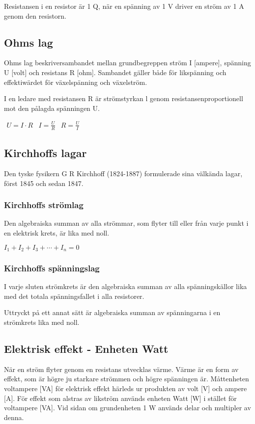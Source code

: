 \documentclass[a4paper,twoside,twocolumn,openright]{book}
\begin{document}
Resistansen i en resistor är 1 Q, när en
spänning av 1 V driver en ström av 1 A
genom den resistorn.

\subsection{Ohms lag}
Ohms lag beskriversambandet mellan grundbegreppen ström I [ampere], spänning U
[volt] och resistans R [ohm].
Sambandet gäller både för likspänning och effektiwärdet för växelspänning och
växelström.

I en ledare med resistansen R är strömstyrkan l genom resistansenproportionell
mot den pålagda spänningen U.

$\begin{array}{ccc}U=I \cdot R & I=\frac{U}{R} & R=\frac{U}{I}\end{array}$

\subsection{Kirchhoffs lagar}

Den tyske fysikern G R Kirchhoff (1824-1887) formulerade sina välkända lagar, först
1845 och sedan 1847.

\subsubsection{Kirchhoffs strömlag}

Den algebraiska summan av alla strömmar, som flyter till eller från varje punkt i
en elektrisk krets, är lika med noll.

$I_1 + I_2 + I_3 + \cdots + I_n = 0$

\subsubsection{Kirchhoffs spänningslag}

I varje sluten strömkrets är den algebraiska summan av alla spänningskällor lika
med det totala spänningsfallet i alla resistorer.

Uttryckt på ett annat sätt är algebraiska summan av spänningarna i en strömkrets lika med
noll.

\subsection{Elektrisk effekt - Enheten Watt}

När en ström flyter genom en resistans utvecklas värme. Värme är en form av effekt,
som är högre ju starkare strömmen och högre spänningen är.
Måttenheten voltampere [VA] för elektrisk effekt härleds ur produkten av volt [V]
och ampere [A].
För effekt som alstras av likström används enheten Watt [W] i stället för voltampere [VA]. Vid sidan om grundenheten 1 W används delar och multipler av denna.
\end{document}
